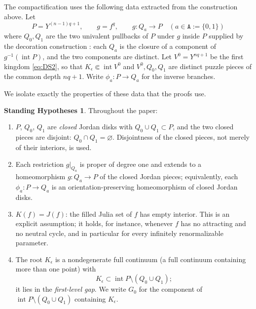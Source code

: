 \documentclass[11pt,reqno]{amsart}
\numberwithin{equation}{section}
\theoremstyle{plain}
\theoremstyle{definition}
\newtheorem{hypotheses}[theorem]{Standing Hypotheses}
\theoremstyle{remark}
\newcommand{\A}{\mathtt A}
\newcommand{\rootK}{K_{\epsilon}}
\begin{document}
The compactification uses the following data extracted from the
construction above.  Let
\begin{equation}
 P=Y^{(n-1)q+1},\qquad
 g=f^q,\qquad
 g\colon Q_a\longrightarrow P\quad(a\in\A:=\{0,1\})
\label{eq:package-data}
\end{equation}
where $Q_0,Q_1$ are the two univalent pullbacks of $P$ under $g$ inside
$P$ supplied by the decoration construction \cite{KLDecorations08}:
each $Q_a$ is the closure of a component of $g^{-1}(\operatorname{int}P)$,
and the two components are distinct.  Let $V^0=Y^{nq+1}$ be the first
kingdom \eqref{eq:DS2}, so that $\rootK\Subset\operatorname{int}V^0$ and
$V^0,Q_0,Q_1$ are distinct puzzle pieces of the common depth $nq+1$.
Write $\phi_a\colon P\to Q_a$ for the inverse branches.

We isolate exactly the properties of these data that the proofs use.

\begin{hypotheses}
\label{hyp:standing}
Throughout the paper:
\begin{enumerate}[label=\textup{(H\arabic*)},leftmargin=3.2em]
 \item \label{H1} $P$, $Q_0$, $Q_1$ are \emph{closed} Jordan disks with
  $Q_0\cup Q_1\subset P$, and the two closed pieces are disjoint:
  $Q_0\cap Q_1=\varnothing$.  Disjointness of the closed pieces, not
  merely of their interiors, is used.
 \item \label{H2} Each restriction $g|_{Q_a}$ is proper of degree one
  and extends to a homeomorphism $g\colon Q_a\to P$ of the closed Jordan
  pieces; equivalently, each $\phi_a\colon P\to Q_a$ is an
  orientation-preserving homeomorphism of closed Jordan disks.
 \item \label{H3} $K(f)=J(f)$: the filled Julia set of $f$ has empty
  interior.  This is an explicit assumption; it holds, for instance,
  whenever $f$ has no attracting and no neutral cycle, and in particular
  for every infinitely renormalizable parameter.
 \item \label{H4} The root $\rootK$ is a nondegenerate full continuum
  (a full continuum containing more than one point) with
  \begin{equation}
   \rootK
   \subset
   \operatorname{int}P\setminus(Q_0\cup Q_1);
  \label{eq:root-gap}
  \end{equation}
  it lies in the \emph{first-level gap}.  We write $G_0$ for the
  component of $\operatorname{int}P\setminus(Q_0\cup Q_1)$ containing
  $\rootK$.
\end{enumerate}
\end{hypotheses}
\end{document}
